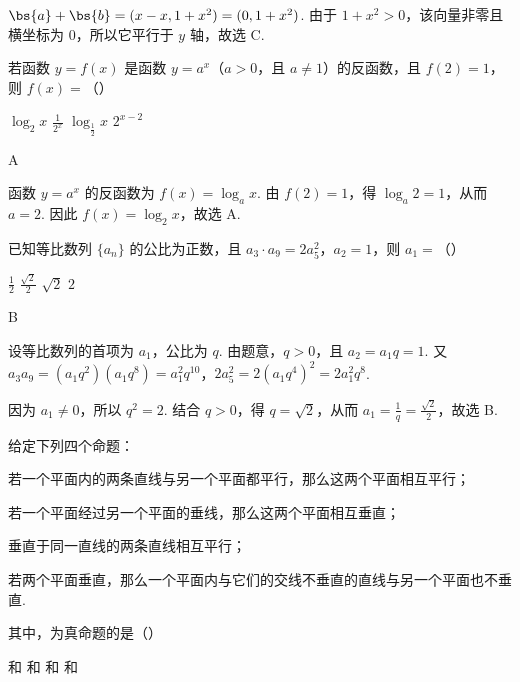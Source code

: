 \begin{solution}
\(\bs{a}+\bs{b}=(x-x,1+x^2)=(0,1+x^2)\). 由于 \(1+x^2>0\)，该向量非零且横坐标为 \(0\)，所以它平行于 \(y\) 轴，故选 C.
\end{solution}

\begin{problem}
若函数 \( y = f(x) \) 是函数 \( y = a^x \)（\(a > 0\)，且 \(a \neq 1\)）的反函数，且 \(f(2) = 1\)，则 \(f(x) =\)（\quad）

\choices
    {\(\log_2 x\)}
    {\(\frac{1}{2^x}\)}
    {\(\log_{\frac{1}{2}} x\)}
    {\(2^{x - 2}\)}
\end{problem}

\begin{answer}
A
\end{answer}

\begin{solution}
函数 \(y=a^x\) 的反函数为 \(f(x)=\log_a x\). 由 \(f(2)=1\)，得 \(\log_a2=1\)，从而 \(a=2\). 因此 \(f(x)=\log_2x\)，故选 A.
\end{solution}

\begin{problem}
已知等比数列 \(\{a_n\}\) 的公比为正数，且 \(a_3 \cdot a_9 = 2a_5^2\)，\(a_2 = 1\)，则 \(a_1 =\)（\quad）

\choices
    {\(\frac{1}{2}\)}
    {\(\frac{\sqrt{2}}{2}\)}
    {\(\sqrt{2}\)}
    {\(2\)}
\end{problem}

\begin{answer}
B
\end{answer}

\begin{solution}
设等比数列的首项为 \(a_1\)，公比为 \(q\). 由题意，\(q>0\)，且 \(a_2=a_1q=1\). 又
\(a_3a_9=(a_1q^2)(a_1q^8)=a_1^2q^{10}\)，\(2a_5^2=2(a_1q^4)^2=2a_1^2q^8\).

因为 \(a_1\ne0\)，所以 \(q^2=2\). 结合 \(q>0\)，得 \(q=\sqrt2\)，从而 \(a_1=\frac{1}{q}=\frac{\sqrt2}{2}\)，故选 B.
\end{solution}

\begin{problem}
给定下列四个命题：
\begin{circlelist}
\item 若一个平面内的两条直线与另一个平面都平行，那么这两个平面相互平行；
\item 若一个平面经过另一个平面的垂线，那么这两个平面相互垂直；
\item 垂直于同一直线的两条直线相互平行；
\item 若两个平面垂直，那么一个平面内与它们的交线不垂直的直线与另一个平面也不垂直.
\end{circlelist}
其中，为真命题的是（\quad）

\choices
    {和}
    {和}
    {和}
    {和}
\end{problem}


